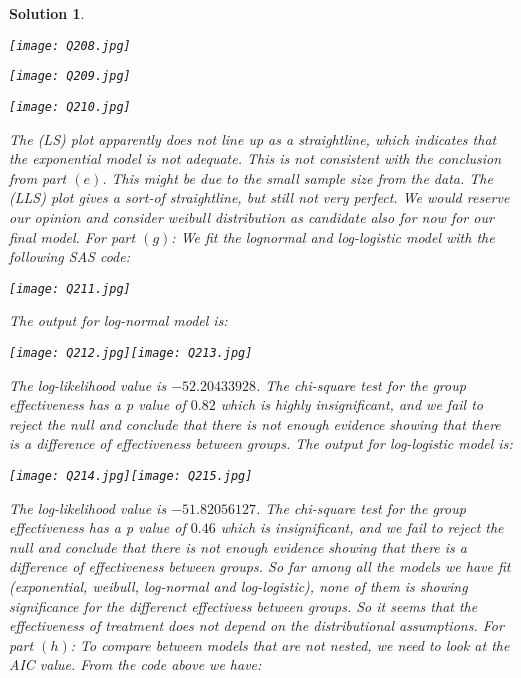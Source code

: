 \documentclass[11pt]{article}
\newtheorem{sol}{Solution}
\begin{document}
\begin{sol}
\begin{center}
		\texttt{[image: Q208.jpg]}
	\end{center}
	\begin{center}
		\texttt{[image: Q209.jpg]}
	\end{center}
	\begin{center}
		\texttt{[image: Q210.jpg]}
	\end{center}
	The (LS) plot apparently does not line up as a straightline, which indicates that the exponential model is not adequate. This is not consistent with the conclusion from part $(e)$. This might be due to the small sample size from the data.\vskip 2mm
	The (LLS) plot gives a sort-of straightline, but still not very perfect. We would reserve our opinion and consider weibull distribution as candidate also for now for our final model.\vskip 2mm
	For part $(g)$:\vskip 2mm
	We fit the lognormal and log-logistic model with the following SAS code:
	\begin{center}
		\texttt{[image: Q211.jpg]}
	\end{center}
	The output for log-normal model is:
	\begin{center}
		\texttt{[image: Q212.jpg]}\texttt{[image: Q213.jpg]}
	\end{center}
	The log-likelihood value is $-52.20433928$.\vskip 2mm
	The chi-square test for the group effectiveness has a p value of $0.82$ which is highly insignificant, and we fail to reject the null and conclude that there is not enough evidence showing that there is a difference of effectiveness between groups.\vskip 2mm
	The output for log-logistic model is:
	\begin{center}
		\texttt{[image: Q214.jpg]}\texttt{[image: Q215.jpg]}
	\end{center}
	The log-likelihood value is $-51.82056127$.\vskip 2mm
	The chi-square test for the group effectiveness has a p value of $0.46$ which is insignificant, and we fail to reject the null and conclude that there is not enough evidence showing that there is a difference of effectiveness between groups.\vskip 2mm
	So far among all the models we have fit (exponential, weibull, log-normal and log-logistic), none of them is showing significance for the differenct effectivess between groups. So it seems that the effectiveness of treatment does not depend on the distributional assumptions.\vskip 2mm
	For part $(h)$:\vskip 2mm
	To compare between models that are not nested, we need to look at the AIC value. From the code above we have:

\end{sol}
\end{document}
